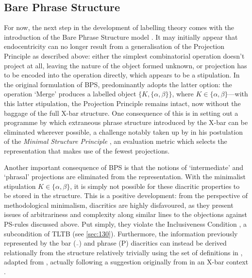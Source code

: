 \subsection{Bare Phrase Structure}\label{sec:240}

For now, the next step in the development of labelling theory comes with the introduction of the Bare Phrase Structure model \parencite[BPS;][]{ChomskyN_1994}. It may initially appear that endocentricity can no longer result from a generalisation of the Projection Principle as described above: either the simplest combinatorial operation doesn't project at all, leaving the nature of the object formed unknown, or projection has to be encoded into the operation directly, which appears to be a stipulation. In the original formulation of BPS, \textcite{ChomskyN_1994,ChomskyN_1995} predominantly adopts the latter option: the operation `Merge' produces a labelled object $\{K,\{\alpha,\beta\}\}$, where $K\in\{\alpha,\beta\}$---with this latter stipulation, the Projection Principle remains intact, now without the baggage of the full X-bar structure. One consequence of this is in setting out a programme by which extraneous phrase structure introduced by the X-bar can be eliminated wherever possible, a challenge notably taken up by \textcite{BoskovicZ_1997} in his postulation of the \textit{Minimal Structure Principle} \parencite[25]{BoskovicZ_1997}, an evaluation metric which selects the representation that makes use of the fewest projections.

Another important consequence of BPS is that the notions of `intermediate' and `phrasal' projections are eliminated from the representation. With the minimalist stipulation $K\in\{\alpha,\beta\}$, it is simply not possible for these diacritic properties to be stored in the structure. This is a positive development: from the perspective of methodological minimalism, diacritics are highly disfavoured, as they present issues of arbitrariness and complexity along similar lines to the objections against PS-rules discussed above. Put simply, they violate the Inclusiveness Condition , a subcondition of TLTB (see \autoref{sec:130}). Furthermore, the information previously represented by the bar ($\bar{\ \ }$) and phrase (P) diacritics can instead be derived relationally from the structure relatively trivially using the set of definitions in , adapted from \textcite[242-243]{ChomskyN_1995}, actually following a suggestion originally from \textcite{MuyskenP_1982} in an X-bar context \parencite[cf. also][]{ChomskyN.LasnikH_2015}.

